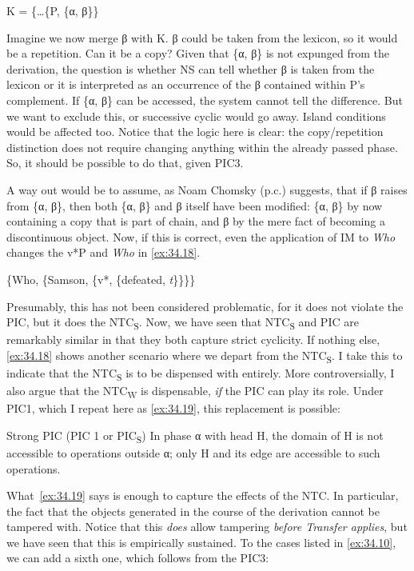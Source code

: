 \documentclass[output=paper]{langsci/langscibook}
\begin{document}
\ea%
    \label{ex:34.17}K = \{\dots{}\{P, \{α, β\}\}
\z

Imagine we now merge β with K. β could be taken from the lexicon, so it would
be a repetition. Can it be a copy? Given that \{α, β\} is not expunged from the
derivation, the question is whether \gls{NS} can tell whether β is taken from
the lexicon or it is interpreted as an occurrence of the β contained within P’s
complement.  If \{α, β\} can be accessed, the system cannot tell the difference.
But we want to exclude this, or successive cyclic  would go away.
Island conditions would be affected too. Notice that the logic here is clear:
the copy\slash repetition distinction does not require changing anything within the
already passed phase. So, it should be possible to do that, given
 PIC3.

A way out would be to assume, as Noam Chomsky (p.c.) suggests, that if β raises
from \{α, β\}, then both \{α, β\} and β itself have been modified: \{α, β\} by
now containing a copy that is part of chain, and β by the mere fact of becoming
a discontinuous object. Now, if this is correct, even the application of \gls{IM} to
\emph{Who} changes the v*P and \emph{Who} in \eqref{ex:34.18}.

\ea%
    \label{ex:34.18}
          \{Who, \{Samson, \{v*, \{defeated, \emph{t}\}\}\}\}
\z

Presumably, this has not been considered problematic, for it does not violate
the \gls{PIC}, but it does the \gls{NTC}\textsubscript{S}. Now, we have seen
that \gls{NTC}\textsubscript{S} and \gls{PIC} are remarkably similar in that
they both capture strict cyclicity. If nothing else, \eqref{ex:34.18} shows
another scenario where we depart from the \gls{NTC}\textsubscript{S}. I take
this to indicate that the \gls{NTC}\textsubscript{S} is to be dispensed with
entirely.  More controversially, I also argue that the NTC\textsubscript{W} is
dispensable, \emph{if} the \gls{PIC} can play its role. Under PIC1, which I
repeat here as \eqref{ex:34.19}, this replacement is possible:

\ea%
    \label{ex:34.19}Strong \gls{PIC} (\gls{PIC} 1 or PIC\textsubscript{S})
    In phase α with head H, the domain of H is not accessible to operations
    outside α; only H and its edge are accessible to such operations.
    \parencite[108]{Chomsky2000}
\z

What~\eqref{ex:34.19} says is enough to capture the effects of the
\gls{NTC}. In particular, the fact that the objects generated in the course of
the derivation cannot be tampered with. Notice that this \emph{does} allow
tampering \emph{before Transfer applies}, but we have seen that this is
empirically sustained. To the cases listed in \eqref{ex:34.10}, we can add
a sixth one, which follows from the PIC3:
\end{document}
